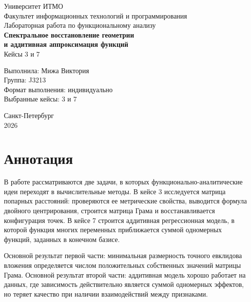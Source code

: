 \documentclass[12pt,a4paper]{article}
\begin{document}
\begin{titlepage}
    \thispagestyle{empty}
    \begin{center}
        Университет ИТМО\\
        Факультет информационных технологий и программирования\\[2.2cm]

        {\Large Лабораторная работа по функциональному анализу}\\[0.5cm]
        {\LARGE\bfseries Спектральное восстановление геометрии\\
        и аддитивная аппроксимация функций}\\[0.4cm]
        {\large Кейсы 3 и 7}\\[2cm]
    \end{center}

    \begin{flushright}
        Выполнила: Мижа Виктория\\
        Группа: J3213\\
        Формат выполнения: индивидуально\\
        Выбранные кейсы: 3 и 7\\
    \end{flushright}

    \vfill

    \begin{center}
        Санкт-Петербург\\
        2026
    \end{center}
\end{titlepage}

\setcounter{page}{1}
\tableofcontents
\newpage

\section*{Аннотация}

В работе рассматриваются две задачи, в которых функционально-аналитические идеи
переходят в вычислительные методы. В кейсе 3 исследуется матрица попарных
расстояний: проверяются ее метрические свойства, выводится формула двойного
центрирования, строится матрица Грама и восстанавливается конфигурация точек.
В кейсе 7 строится аддитивная регрессионная модель, в которой функция многих
переменных приближается суммой одномерных функций, заданных в конечном базисе.

Основной результат первой части: минимальная размерность точного евклидова
вложения определяется числом положительных собственных значений матрицы Грама.
Основной результат второй части: аддитивная модель хорошо работает на данных,
где зависимость действительно является суммой одномерных эффектов, но теряет
качество при наличии взаимодействий между признаками.
\end{document}
